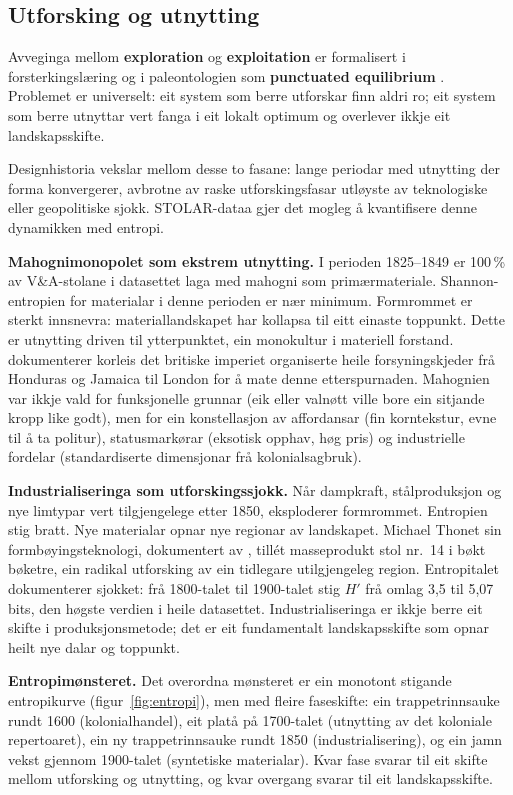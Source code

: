 \documentclass[12pt, a4paper]{article}
\begin{document}
\subsection{Utforsking og utnytting}

Avveginga mellom \textbf{exploration} og \textbf{exploitation} er formalisert i forsterkingslæring \citep{sutton2018} og i paleontologien som \textbf{punctuated equilibrium} \citep{eldredge1972}. Problemet er universelt: eit system som berre utforskar finn aldri ro; eit system som berre utnyttar vert fanga i eit lokalt optimum og overlever ikkje eit landskapsskifte.

Designhistoria vekslar mellom desse to fasane: lange periodar med utnytting der forma konvergerer, avbrotne av raske utforskingsfasar utløyste av teknologiske eller geopolitiske sjokk. STOLAR-dataa gjer det mogleg å kvantifisere denne dynamikken med entropi.

\textbf{Mahognimonopolet som ekstrem utnytting.} I perioden 1825--1849 er 100\,\% av V\&A-stolane i datasettet laga med mahogni som primærmateriale. Shannon-entropien for materialar i denne perioden er nær minimum. Formrommet er sterkt innsnevra: materiallandskapet har kollapsa til eitt einaste toppunkt. Dette er utnytting driven til ytterpunktet, ein monokultur i materiell forstand. \citet{anderson1995} dokumenterer korleis det britiske imperiet organiserte heile forsyningskjeder frå Honduras og Jamaica til London for å mate denne etterspurnaden. Mahognien var ikkje vald for funksjonelle grunnar (eik eller valnøtt ville bore ein sitjande kropp like godt), men for ein konstellasjon av affordansar (fin korntekstur, evne til å ta politur), statusmarkørar (eksotisk opphav, høg pris) og industrielle fordelar (standardiserte dimensjonar frå kolonialsagbruk).

\textbf{Industrialiseringa som utforskingssjokk.} Når dampkraft, stålproduksjon og nye limtypar vert tilgjengelege etter 1850, eksploderer formrommet. Entropien stig bratt. Nye materialar opnar nye regionar av landskapet. Michael Thonet sin formbøyingsteknologi, dokumentert av \citet{thonet1976}, tillét masseprodukt stol nr.~14 i bøkt bøketre, ein radikal utforsking av ein tidlegare utilgjengeleg region. Entropitalet dokumenterer sjokket: frå 1800-talet til 1900-talet stig $H'$ frå omlag 3,5 til 5,07 bits, den høgste verdien i heile datasettet. Industrialiseringa er ikkje berre eit skifte i produksjonsmetode; det er eit fundamentalt landskapsskifte som opnar heilt nye dalar og toppunkt.

\textbf{Entropimønsteret.} Det overordna mønsteret er ein monotont stigande entropikurve (figur~\ref{fig:entropi}), men med fleire faseskifte: ein trappetrinnsauke rundt 1600 (kolonialhandel), eit platå på 1700-talet (utnytting av det koloniale repertoaret), ein ny trappetrinnsauke rundt 1850 (industrialisering), og ein jamn vekst gjennom 1900-talet (syntetiske materialar). Kvar fase svarar til eit skifte mellom utforsking og utnytting, og kvar overgang svarar til eit landskapsskifte.
\end{document}
